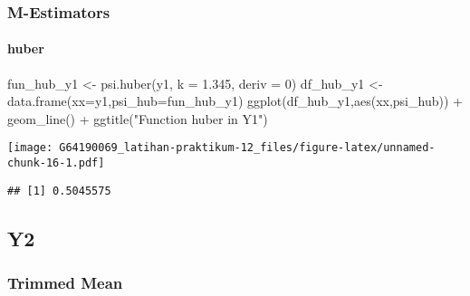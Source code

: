 \documentclass[
]{article}
\newenvironment{Shaded}{\begin{snugshade}}{\end{snugshade}}
\newcommand{\AttributeTok}[1]{\textcolor[rgb]{0.77,0.63,0.00}{#1}}
\newcommand{\DecValTok}[1]{\textcolor[rgb]{0.00,0.00,0.81}{#1}}
\newcommand{\FloatTok}[1]{\textcolor[rgb]{0.00,0.00,0.81}{#1}}
\newcommand{\FunctionTok}[1]{\textcolor[rgb]{0.00,0.00,0.00}{#1}}
\newcommand{\NormalTok}[1]{#1}
\newcommand{\OtherTok}[1]{\textcolor[rgb]{0.56,0.35,0.01}{#1}}
\newcommand{\SpecialCharTok}[1]{\textcolor[rgb]{0.00,0.00,0.00}{#1}}
\newcommand{\StringTok}[1]{\textcolor[rgb]{0.31,0.60,0.02}{#1}}
\begin{document}
\hypertarget{m-estimators-2}{%
\subsubsection{M-Estimators}\label{m-estimators-2}}

\hypertarget{huber-2}{%
\paragraph{huber}\label{huber-2}}

\begin{Shaded}
\begin{Highlighting}[]
\NormalTok{fun\_hub\_y1 }\OtherTok{\textless{}{-}} \FunctionTok{psi.huber}\NormalTok{(y1, }\AttributeTok{k =} \FloatTok{1.345}\NormalTok{, }\AttributeTok{deriv =} \DecValTok{0}\NormalTok{)}
\NormalTok{df\_hub\_y1 }\OtherTok{\textless{}{-}} \FunctionTok{data.frame}\NormalTok{(}\AttributeTok{xx=}\NormalTok{y1,}\AttributeTok{psi\_hub=}\NormalTok{fun\_hub\_y1)}
\FunctionTok{ggplot}\NormalTok{(df\_hub\_y1,}\FunctionTok{aes}\NormalTok{(xx,psi\_hub)) }\SpecialCharTok{+} 
  \FunctionTok{geom\_line}\NormalTok{() }\SpecialCharTok{+} \FunctionTok{ggtitle}\NormalTok{(}\StringTok{"Function huber in Y1"}\NormalTok{)}
\end{Highlighting}
\end{Shaded}

\texttt{[image: G64190069\_latihan-praktikum-12\_files/figure-latex/unnamed-chunk-16-1.pdf]}

\begin{Shaded}
\end{Shaded}

\begin{verbatim}
## [1] 0.5045575
\end{verbatim}

\hypertarget{y2-1}{%
\subsection{Y2}\label{y2-1}}

\hypertarget{trimmed-mean-3}{%
\subsubsection{Trimmed Mean}\label{trimmed-mean-3}}
\end{document}
